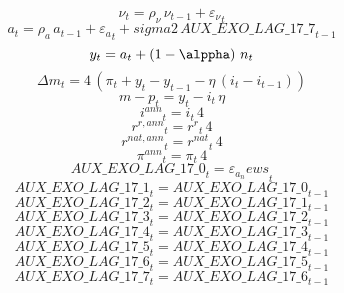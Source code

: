 \begin{dmath}
{{\nu}}_{t}={{\rho_{\nu}}}\, {{\nu}}_{t-1}+{{\varepsilon_\nu}}_{t}
\end{dmath}
\begin{dmath}
{{a}}_{t}={{\rho_a}}\, {{a}}_{t-1}+{{\varepsilon_a}}_{t}+{sigma2}\, {AUX\_EXO\_LAG\_17\_7}_{t-1}
\end{dmath}
\begin{dmath}
{{y}}_{t}={{a}}_{t}+\left(1-{{\alppha}}\right)\, {{n}}_{t}
\end{dmath}
\begin{dmath}
{{\Delta m}}_{t}=4\, \left({{\pi}}_{t}+{{y}}_{t}-{{y}}_{t-1}-{{\eta}}\, \left({{i}}_{t}-{{i}}_{t-1}\right)\right)
\end{dmath}
\begin{dmath}
{{m-p}}_{t}={{y}}_{t}-{{i}}_{t}\, {{\eta}}
\end{dmath}
\begin{dmath}
{{i^{ann}}}_{t}={{i}}_{t}\, 4
\end{dmath}
\begin{dmath}
{{r^{r,ann}}}_{t}={{r^r}}_{t}\, 4
\end{dmath}
\begin{dmath}
{{r^{nat,ann}}}_{t}={{r^{nat}}}_{t}\, 4
\end{dmath}
\begin{dmath}
{{\pi^{ann}}}_{t}={{\pi}}_{t}\, 4
\end{dmath}
\begin{dmath}
{AUX\_EXO\_LAG\_17\_0}_{t}={{\varepsilon_a_news}}_{t}
\end{dmath}
\begin{dmath}
{AUX\_EXO\_LAG\_17\_1}_{t}={AUX\_EXO\_LAG\_17\_0}_{t-1}
\end{dmath}
\begin{dmath}
{AUX\_EXO\_LAG\_17\_2}_{t}={AUX\_EXO\_LAG\_17\_1}_{t-1}
\end{dmath}
\begin{dmath}
{AUX\_EXO\_LAG\_17\_3}_{t}={AUX\_EXO\_LAG\_17\_2}_{t-1}
\end{dmath}
\begin{dmath}
{AUX\_EXO\_LAG\_17\_4}_{t}={AUX\_EXO\_LAG\_17\_3}_{t-1}
\end{dmath}
\begin{dmath}
{AUX\_EXO\_LAG\_17\_5}_{t}={AUX\_EXO\_LAG\_17\_4}_{t-1}
\end{dmath}
\begin{dmath}
{AUX\_EXO\_LAG\_17\_6}_{t}={AUX\_EXO\_LAG\_17\_5}_{t-1}
\end{dmath}
\begin{dmath}
{AUX\_EXO\_LAG\_17\_7}_{t}={AUX\_EXO\_LAG\_17\_6}_{t-1}
\end{dmath}
